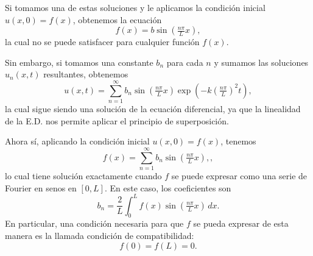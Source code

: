 \documentclass[11pt,letterpaper,draft]{report}
\newcommand\<{\langle}
\renewcommand\>{\rangle}
\begin{document}
Si tomamos una de estas soluciones y le aplicamos la condición
inicial $u(x,0)=f(x)$, obtenemos la ecuación
\[
  f(x) = b \sin(\tfrac{n\pi}{L}x)
,\]
la cual no se puede satisfacer para cualquier función $f(x)$.

Sin embargo, si tomamos una constante $b_n$ para cada $n$ y
sumamos las soluciones $u_n(x,t)$ resultantes, obtenemos
\begin{equation}
  u(x,t)
  = \sum_{n=1}^{\infty}
  b_n\sin(\tfrac{n\pi}{L}x)\exp(-k(\tfrac{n\pi}{L})^2t),
\end{equation}
la cual sigue siendo una solución de la ecuación diferencial, ya
que la linealidad de la E.D. nos permite aplicar
el principio de superposición.

Ahora sí, aplicando la condición inicial $u(x,0)=f(x)$, tenemos
\[
  f(x)
  = \sum_{n=1}^{\infty}
  b_n\sin(\tfrac{n\pi}{L}x),
,\]
lo cual tiene solución exactamente cuando $f$ se puede expresar
como una serie de Fourier en senos en $[0,L]$. En este caso, los
coeficientes son
\[
  b_n = \frac{2}{L}\int_0^L f(x)\sin(\tfrac{n\pi}{L}x)\,dx
.\]
En particular, una condición necesaria para que $f$ se pueda
expresar de esta manera es la llamada condición de
compatibilidad:
\[
  f(0)=f(L)=0
.\]
\end{document}
